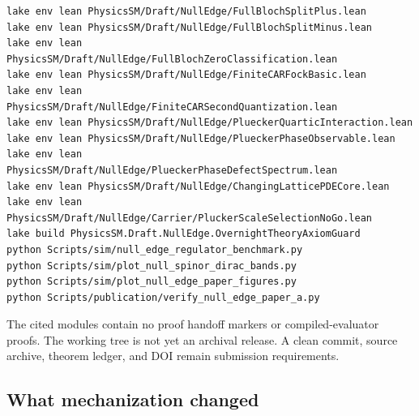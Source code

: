 \documentclass[11pt]{article}
\begin{document}
\begin{verbatim}
lake env lean PhysicsSM/Draft/NullEdge/FullBlochSplitPlus.lean
lake env lean PhysicsSM/Draft/NullEdge/FullBlochSplitMinus.lean
lake env lean PhysicsSM/Draft/NullEdge/FullBlochZeroClassification.lean
lake env lean PhysicsSM/Draft/NullEdge/FiniteCARFockBasic.lean
lake env lean PhysicsSM/Draft/NullEdge/FiniteCARSecondQuantization.lean
lake env lean PhysicsSM/Draft/NullEdge/PlueckerQuarticInteraction.lean
lake env lean PhysicsSM/Draft/NullEdge/PlueckerPhaseObservable.lean
lake env lean PhysicsSM/Draft/NullEdge/PlueckerPhaseDefectSpectrum.lean
lake env lean PhysicsSM/Draft/NullEdge/ChangingLatticePDECore.lean
lake env lean PhysicsSM/Draft/NullEdge/Carrier/PluckerScaleSelectionNoGo.lean
lake build PhysicsSM.Draft.NullEdge.OvernightTheoryAxiomGuard
python Scripts/sim/null_edge_regulator_benchmark.py
python Scripts/sim/plot_null_spinor_dirac_bands.py
python Scripts/sim/plot_null_edge_paper_figures.py
python Scripts/publication/verify_null_edge_paper_a.py
\end{verbatim}
The cited modules contain no proof handoff markers or compiled-evaluator proofs.
The working tree is not yet an archival release.  A clean commit, source
archive, theorem ledger, and DOI remain submission requirements.

\subsection*{What mechanization changed}
\end{document}
